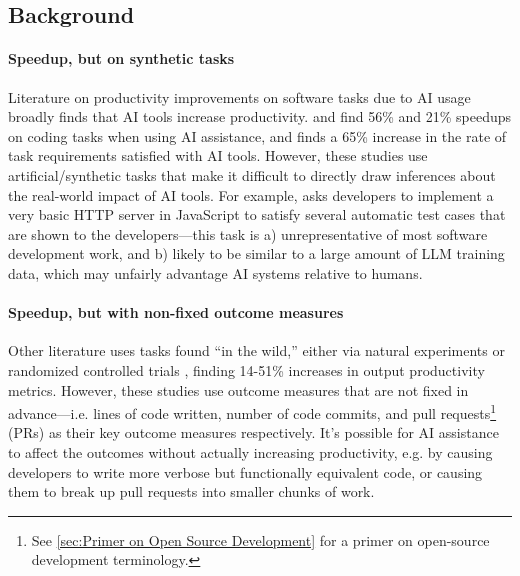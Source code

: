 \documentclass{article}
\begin{document}
\subsection{Background}
\label{sec:Background}

\paragraph*{Speedup, but on synthetic tasks}
Literature on productivity improvements on software tasks due to AI usage broadly finds that AI tools increase productivity. 
\citet{peng2023impactaideveloperproductivity} and \citet{paradis2024doesaiimpactdevelopment} find 56\% and 21\% speedups on coding tasks when using AI assistance, and \citet{10.1145/3661145} finds a 65\% increase in the rate of task requirements satisfied with AI tools. However, these studies use artificial/synthetic tasks that make it difficult to directly draw inferences about the real-world impact of AI tools. For example, \citet{peng2023impactaideveloperproductivity} asks developers to implement a very basic HTTP server in JavaScript to satisfy several automatic test cases that are shown to the developers---this task is a) unrepresentative of most software development work, and b) likely to be similar to a large amount of LLM training data, which may unfairly advantage AI systems relative to humans.

\paragraph*{Speedup, but with non-fixed outcome measures}
Other literature uses tasks found ``in the wild,'' either via natural experiments \cite{yeverechyahu2025impactllmopensource} or randomized controlled trials \cite{gambacorta2024generative, cui2025effectsgenerativeai}, finding 14-51\% increases in output productivity metrics. However, these studies use outcome measures that are not fixed in advance---i.e. lines of code written, number of code commits, and pull requests\footnote{See \autoref{sec:Primer on Open Source Development} for a primer on open-source development terminology.} (PRs) as their key outcome measures respectively. It's possible for AI assistance to affect the outcomes without actually increasing productivity, e.g. by causing developers to write more verbose but functionally equivalent code, or causing them to break up pull requests into smaller chunks of work.
\end{document}

